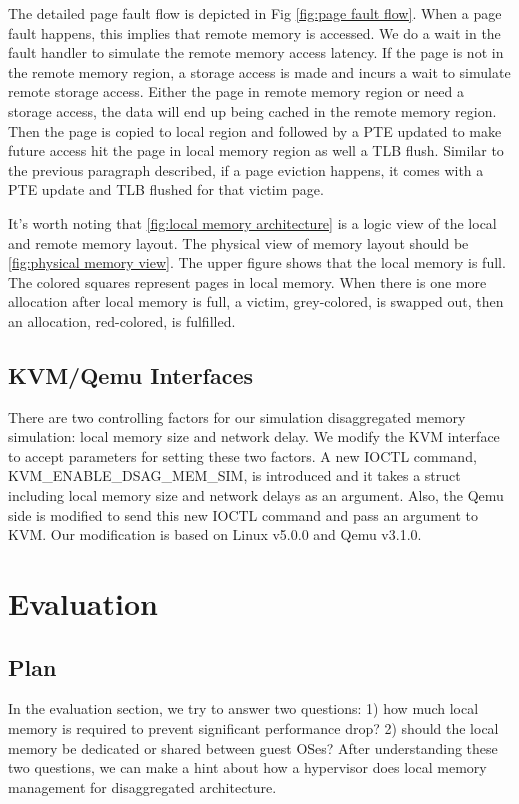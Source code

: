 \documentclass[twocolumn]{article}
\begin{document}
The detailed page fault flow is depicted in Fig \ref{fig:page fault flow}. When a page fault happens, this implies that remote memory is accessed. We do a wait in the fault handler to simulate the remote memory access latency. If the page is not in the remote memory region, a storage access is made and incurs a wait to simulate remote storage access. Either the page in remote memory region or need a storage access, the data will end up being cached in the remote memory region. Then the page is copied to local region and followed by a PTE updated to make future access hit the page in local memory region as well a TLB flush. Similar to the previous paragraph described, if a page eviction happens, it comes with a PTE update and TLB flushed for that victim page.

It's worth noting that \ref{fig:local memory architecture} is a logic view of the local and remote memory layout. The physical view of memory layout should be \ref{fig:physical memory view}. The upper figure shows that the local memory is full. The colored squares represent pages in local memory. When there is one more allocation after local memory is full, a victim, grey-colored, is swapped out, then an allocation, red-colored, is fulfilled.
                                         
\subsection{KVM/Qemu Interfaces}                         
There are two controlling factors for our simulation disaggregated memory simulation: local memory size and network delay. We modify the KVM interface to accept parameters for setting these two factors. A new IOCTL command, KVM\_ENABLE\_DSAG\_MEM\_SIM, is introduced and it takes a struct including local memory size and network delays as an argument. Also, the Qemu side is modified to send this new IOCTL command and pass an argument to KVM. Our modification is based on Linux v5.0.0 and Qemu v3.1.0.

\section{Evaluation}

\subsection{Plan}
In the evaluation section, we try to answer two questions: 1) how much local memory is required to prevent significant performance drop? 2) should the local memory be dedicated or shared between guest OSes? After understanding these two questions, we can make a hint about how a hypervisor does local memory management for disaggregated architecture.
\end{document}
